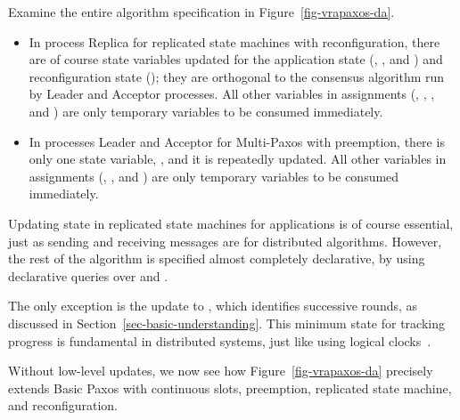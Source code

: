 \documentclass[11pt]{article}
\begin{document}
Examine the entire algorithm specification in Figure~\ref{fig-vrapaxos-da}.
\begin{itemize}
\item In process Replica for replicated state machines with
  reconfiguration, there are of course state variables updated for the
  application state (, , and ) and
  reconfiguration state (); they are orthogonal to the consensus
  algorithm run by Leader and Acceptor processes.  All other variables in
  assignments (, , , and ) are
  only temporary variables to be consumed immediately.
\item In processes Leader and Acceptor for Multi-Paxos with preemption,
  there is only one state variable, , and it is repeatedly
  updated.  All other variables in assignments (, , and
  ) are only temporary variables to be consumed immediately.
\end{itemize}

Updating state in replicated state machines for applications is of course
essential, just as sending and receiving messages are for distributed
algorithms.  However, the rest of the algorithm is specified almost
completely declarative, by using declarative queries over  and
.

The only exception is the update to , which identifies successive
rounds, as discussed in Section~\ref{sec-basic-understanding}.   
This minimum state for tracking progress is fundamental in 
distributed systems, just like using logical clocks~\cite{Lam78}.


\label{sec-multi-understanding}

Without low-level updates, we now see how Figure~\ref{fig-vrapaxos-da} 
precisely extends Basic Paxos with continuous slots, preemption, 
replicated state machine, and reconfiguration.
\end{document}
